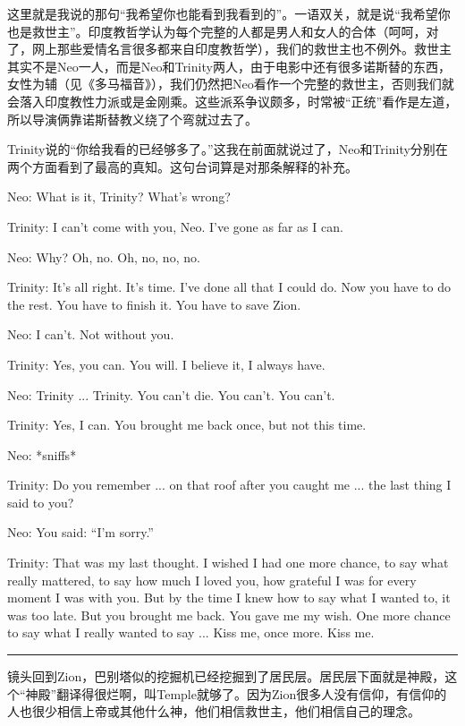\documentclass[UTF8]{ctexart}
\newcommand{\myparsep}{\noindent \rule[0.5ex]{\linewidth}{1pt}}
\newenvironment{myquote}{\color{green} \setlength{\leftskip}{6em} \setlength{\rightskip}{4em} \setlength{\parindent}{-2em}}{\par}
\begin{document}
这里就是我说的那句“我希望你也能看到我看到的”。一语双关，就是说“我希望你也是救世主”。印度教哲学认为每个完整的人都是男人和女人的合体（呵呵，对了，网上那些爱情名言很多都来自印度教哲学），我们的救世主也不例外。救世主其实不是Neo一人，而是Neo和Trinity两人，由于电影中还有很多诺斯替的东西，女性为辅（见《多马福音》），我们仍然把Neo看作一个完整的救世主，否则我们就会落入印度教性力派或是金刚乘。这些派系争议颇多，时常被“正统”看作是左道，所以导演俩靠诺斯替教义绕了个弯就过去了。

Trinity说的“你给我看的已经够多了。”这我在前面就说过了，Neo和Trinity分别在两个方面看到了最高的真知。这句台词算是对那条解释的补充。

\begin{myquote}
Neo: What is it, Trinity? What's wrong?

Trinity: I can't come with you, Neo. I've gone as far as I can.

Neo: Why? Oh, no. Oh, no, no, no.

Trinity: It's all right. It's time. I've done all that I could do. Now you have to do the rest. You have to finish it. You have to save Zion.

Neo: I can't. Not without you.

Trinity: Yes, you can. You will. I believe it, I always have.

Neo: Trinity ... Trinity. You can't die. You can't. You can't.

Trinity: Yes, I can. You brought me back once, but not this time.

Neo: *sniffs*

Trinity: Do you remember ... on that roof after you caught me ... the last thing I said to you?

Neo: You said: ``I'm sorry.''

Trinity: That was my last thought. I wished I had one more chance, to say what really mattered, to say how much I loved you, how grateful I was for every moment I was with you. But by the time I knew how to say what I wanted to, it was too late. But you brought me back. You gave me my wish. One more chance to say what I really wanted to say ... Kiss me, once more. Kiss me.
\end{myquote}

\myparsep

镜头回到Zion，巴别塔似的挖掘机已经挖掘到了居民层。居民层下面就是神殿，这个“神殿”翻译得很烂啊，叫Temple就够了。因为Zion很多人没有信仰，有信仰的人也很少相信上帝或其他什么神，他们相信救世主，他们相信自己的理念。
\end{document}
